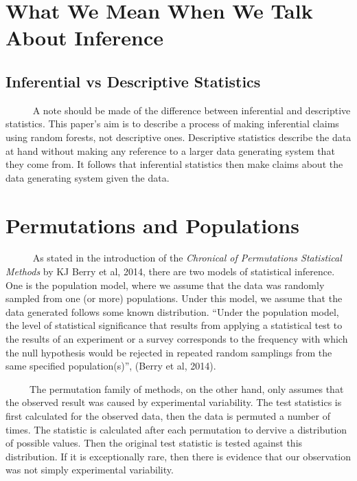 \documentclass[12pt,twoside]{reedthesis}
\begin{document}
  \section{What We Mean When We Talk About
  Inference}\label{what-we-mean-when-we-talk-about-inference}
  
  \subsection{Inferential vs Descriptive
  Statistics}\label{inferential-vs-descriptive-statistics}
  
  ~~~~~ A note should be made of the difference between inferential and
  descriptive statistics. This paper's aim is to describe a process of
  making inferential claims using random forests, not descriptive ones.
  Descriptive statistics describe the data at hand without making any
  reference to a larger data generating system that they come from. It
  follows that inferential statistics then make claims about the data
  generating system given the data.
  
  \section{Permutations and
  Populations}\label{permutations-and-populations}
  
  ~~~~~ As stated in the introduction of the \emph{Chronical of
  Permutations Statistical Methods} by KJ Berry et al, 2014, there are two
  models of statistical inference. One is the population model, where we
  assume that the data was randomly sampled from one (or more)
  populations. Under this model, we assume that the data generated follows
  some known distribution. ``Under the population model, the level of
  statistical significance that results from applying a statistical test
  to the results of an experiment or a survey corresponds to the frequency
  with which the null hypothesis would be rejected in repeated random
  samplings from the same specified population(s)'', (Berry et al, 2014).
  
  ~~~~~The permutation family of methods, on the other hand, only assumes
  that the observed result was caused by experimental variability. The
  test statistics is first calculated for the observed data, then the data
  is permuted a number of times. The statistic is calculated after each
  permutation to dervive a distribution of possible values. Then the
  original test statistic is tested against this distribution. If it is
  exceptionally rare, then there is evidence that our observation was not
  simply experimental variability.
  
\end{document}
